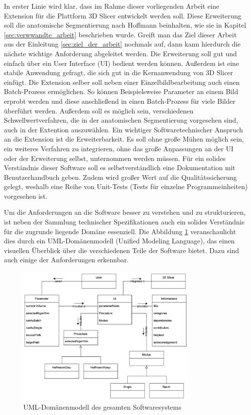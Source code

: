 In erster Linie wird klar, dass im Rahme dieser vorliegenden Arbeit eine
Extension für die Plattform 3D Slicer entwickelt werden soll. Diese Erweiterung soll
die anatomische Segmentierung nach Hoffmann \citep[vgl.][]{hoffmann2020}
beinhalten, wie sie in Kapitel \ref{sec:verwwandte_arbeit} beschrieben wurde.
Greift man das Ziel dieser Arbeit aus der Einleitung \ref{sec:ziel_der_arbeit}
nochmals auf, dann kann hierdurch die nächste wichtige Anforderung abgeleitet werden.
Die Erweiterung soll gut und einfach über ein User Interface (UI) bedient werden
können. Außerdem ist eine stabile Anwendung gefragt, die sich gut in die
Kernanwendung von 3D Slicer einfügt. Die Extension selber soll neben einer Einzelbildbearbeitung
auch einen Batch-Prozess ermöglichen. So können Beispielsweise Parameter an
einem Bild erprobt werden und diese anschließend in einen Batch-Prozess für
viele Bilder überführt werden. Außerdem soll es möglich sein, verschiedenen
Schwellwertverfahren, die in der anatomischen Segmentierung vorgesehen sind,
auch in der Extention auszuwählen. Ein wichtiger Softwaretechnischer Anspruch an
die Extension ist die Erweiterbarkeit. Es soll ohne große Mühen möglich sein, ein
weiteres Verfahren zu integrieren, ohne das große Anpassungen an der UI oder der
Erweiterung selbst, unternommen werden müssen. Für ein solides Verständnis
dieser Software soll es selbstverständlich eine Dokumentation mit
Benutzerhandbuch geben. Zudem wird großer Wert auf die Qualitätssicherung gelegt,
weshalb eine Reihe von Unit-Tests (Tests für einzelne Programmeinheiten)
vorgesehen ist.

Um die Anforderungen an die Software besser zu verstehen und zu strukturieren, ist
neben der Sammlung technischer Spezifikationen auch ein solides Verständnis für die
zugrunde liegende Domäne essenziell. Die Abbildung \ref{fig:3d_slicer_domäne}
veranschaulicht dies durch ein UML-Domänenmodell (Unified Modeling Language), das
einen visuellen Überblick über die verschiedenen Teile der Software bietet. Dazu
sind auch einige der Anforderungen erkennbar.

\begin{figure}[h]
	\centering
	\includegraphics[width=0.8\textwidth]{img/domaenenmodell.jpg}
	\caption{UML-Domänenmodell des gesamten Softwaresystems}
	\label{fig:3d_slicer_domäne}
\end{figure}

